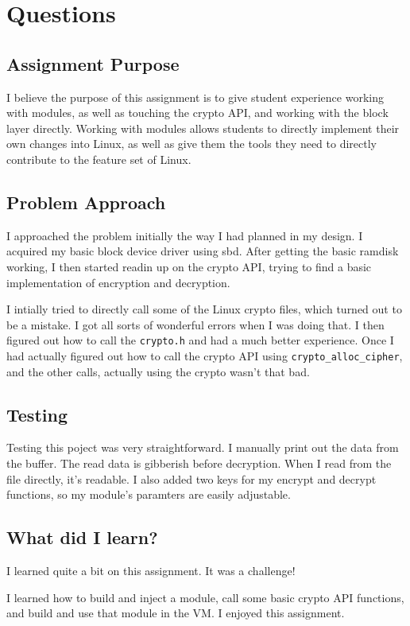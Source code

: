 \documentclass[10pt,letterpaper,onecolumn,draftclsnofoot]{IEEEtran}
\begin{document}
\section{Questions}
	\subsection{Assignment Purpose}
	I believe the purpose of this assignment is to give student experience working
	with modules, as well as touching the crypto API, and working with the block
	layer directly. Working with modules allows students to directly implement
	their own changes into Linux, as well as give them the tools they need to
	directly contribute to the feature set of Linux.

	\subsection{Problem Approach}
	I approached the problem initially the way I had planned in my design. I 
	acquired my basic block device driver using sbd. After getting the basic
	ramdisk working, I then started readin up on the crypto API, trying to find
	a basic implementation of encryption and decryption.

	I intially tried to directly call some of the Linux crypto files, which turned
	out to be a mistake. I got all sorts of wonderful errors when I was doing that.
	I then figured out how to call the \texttt{crypto.h} and had a much better experience.
	Once I had actually figured out how to call the crypto API using 
	\texttt{crypto\_alloc\_cipher}, and the other calls, actually
	using the crypto wasn't that bad.
	
	\subsection{Testing}
	Testing this poject was very straightforward. I manually print out the data
	from the buffer. The read data is gibberish before decryption. When I read from
	the file directly, it's readable. I also added two keys for my encrypt
	and decrypt functions, so my module's paramters are easily adjustable.

	\subsection{What did I learn?}
	I learned quite a bit on this assignment. It was a challenge!

	I learned how to build and inject a module, call some basic crypto API 
	functions, and build and use that module in the VM. I enjoyed this assignment.
\end{document}
